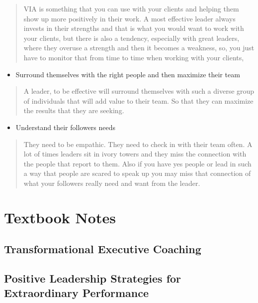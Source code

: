 \documentclass[]{book}
\begin{document}
\begin{quote}
VIA is something that you can use with your clients and helping them show up more positively in their work. A most effective leader always invests in their strengths and that is what you would want to work with your clients, but there is also a tendency, especially with great leaders, where they overuse a strength and then it becomes a weakness, so, you just have to monitor that from time to time when working with your clients,
\end{quote}

\begin{itemize}
\item
  Surround themselves with the right people and then maximize their team
\end{itemize}

\begin{quote}
A leader, to be effective will surround themselves with such a diverse group of individuals that will add value to their team. So that they can maximize the results that they are seeking.
\end{quote}

\begin{itemize}
\item
  Understand their followers needs
\end{itemize}

\begin{quote}
They need to be empathic. They need to check in with their team often. A lot of times leaders sit in ivory towers and they miss the connection with the people that report to them. Also if you have yes people or lead in such a way that people are scared to speak up you may miss that connection of what your followers really need and want from the leader.
\end{quote}

\hypertarget{textbooks}{%
\chapter{Textbook Notes}\label{textbooks}}

\hypertarget{transformational-executive-coaching}{%
\section{Transformational Executive Coaching}\label{transformational-executive-coaching}}

\hypertarget{positive-leadership-strategies-for-extraordinary-performance}{%
\section{Positive Leadership Strategies for Extraordinary Performance}\label{positive-leadership-strategies-for-extraordinary-performance}}


\end{document}
